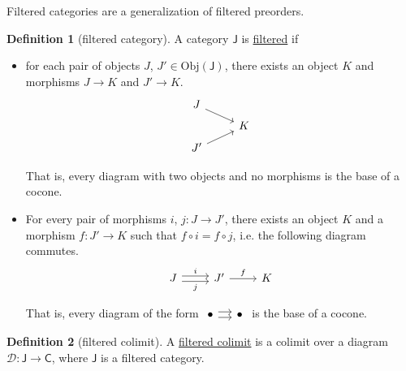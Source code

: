 \documentclass[a4paper]{report}
\newcommand{\defn}[1]{\ul{#1}}
\newcommand{\Obj}{\mathrm{Obj}}
\theoremstyle{definition}
\newtheorem{definition}{Definition}[section]
\theoremstyle{plain}
\theoremstyle{remark}
\begin{document}
Filtered categories are a generalization of filtered preorders.

\begin{definition}[filtered category]
  \label{def:filteredcategory}
  A category $\mathsf{J}$ is \defn{filtered} if
  \begin{itemize}
    \item for each pair of objects $J$, $J' \in \Obj(\mathsf{J})$, there exists an object $K$ and morphisms $J \to K$ and $J' \to K$.
      \begin{equation*}
        \begin{tikzcd}[row sep=tiny]
          J
          \arrow[dr]
          \\
          & K
          \\
          J'
          \arrow[ur]
        \end{tikzcd}
      \end{equation*}

      That is, every diagram with two objects and no morphisms is the base of a cocone.

    \item For every pair of morphisms $i$, $j\colon J \to J'$, there exists an object $K$ and a morphism $f\colon J' \to K$ such that $f \circ i = f \circ j$, i.e. the following diagram commutes.
      \begin{equation*}
        \begin{tikzcd}[row sep=tiny]
          J
          \arrow[r, shift left, "i"]
          \arrow[r, shift right, swap, "j"]
          & J'
          \arrow[r, "f"]
          & K
        \end{tikzcd}
      \end{equation*}

      That is, every diagram of the form $\begin{tikzcd}[column sep=small]\bullet \arrow[r, shift left] \arrow[r, shift right] & \bullet \end{tikzcd}$ is the base of a cocone.
  \end{itemize}
\end{definition}

\begin{definition}[filtered colimit]
  \label{def:filteredcolimit}
  A \defn{filtered colimit} is a colimit over a diagram $\mathcal{D}\colon \mathsf{J} \to \mathsf{C}$, where $\mathsf{J}$ is a filtered category.
\end{definition}
\end{document}
